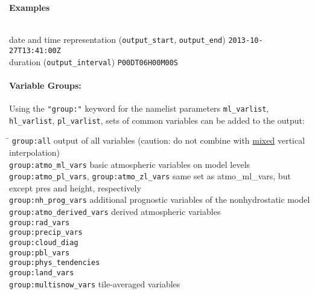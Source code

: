 \begin{tabbing}
  \parbox{0.7\textwidth}{\textbf{Examples}} \= \\
  date and time representation (\texttt{output\_start}, \texttt{output\_end}) \>
  \texttt{2013-10-27T13:41:00Z} \\
  duration (\texttt{output\_interval}) \>
  \texttt{P00DT06H00M00S} \\
\end{tabbing}



\paragraph{Variable Groups:}
Using the \texttt{"group:"} keyword for the namelist parameters \texttt{ml\_varlist}, \texttt{hl\_varlist}, \texttt{pl\_varlist},
sets of common variables can be added to the output:
\begin{tabbing}
\hspace*{0.4\textwidth} \= \kill
\texttt{group:all}                     \>      output of all variables (caution: do not combine with \underline{mixed} vertical interpolation) \\
\texttt{group:atmo\_ml\_vars}          \>      basic atmospheric variables on model levels                          \\
\texttt{group:atmo\_pl\_vars},
\texttt{group:atmo\_zl\_vars}          \>      same set as atmo\_ml\_vars, but except pres and height, respectively \\
\texttt{group:nh\_prog\_vars}          \>      additional prognostic variables of the nonhydrostatic model          \\
\texttt{group:atmo\_derived\_vars}     \>      derived atmospheric variables                                        \\
\texttt{group:rad\_vars}               \>                                                                           \\
\texttt{group:precip\_vars}            \>                                                                           \\
\texttt{group:cloud\_diag}             \>                                                                           \\
\texttt{group:pbl\_vars}               \>                                                                           \\
\texttt{group:phys\_tendencies}        \>                                                                           \\
\texttt{group:land\_vars}              \>                                                                           \\
\texttt{group:multisnow\_vars}         \>     tile-averaged variables
\end{tabbing}

